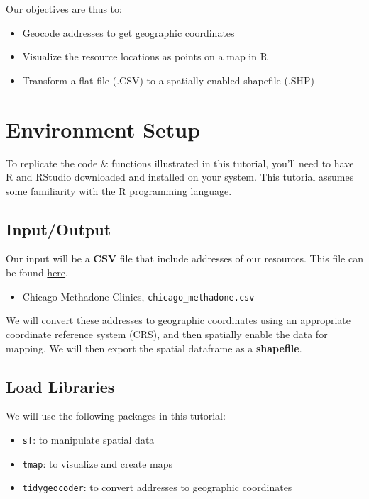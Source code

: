 \documentclass[
  letterpaper,
  DIV=11,
  numbers=noendperiod]{scrreprt}
\providecommand{\tightlist}{%
  \setlength{\itemsep}{0pt}\setlength{\parskip}{0pt}}
\begin{document}
Our objectives are thus to:

\begin{itemize}
\tightlist
\item
  Geocode addresses to get geographic coordinates
\item
  Visualize the resource locations as points on a map in R
\item
  Transform a flat file (.CSV) to a spatially enabled shapefile (.SHP)
\end{itemize}

\section{Environment Setup}\label{GA-setup}

To replicate the code \& functions illustrated in this tutorial, you'll
need to have R and RStudio downloaded and installed on your system. This
tutorial assumes some familiarity with the R programming language.

\subsection{Input/Output}\label{GA-i-o}

Our input will be a \textbf{CSV} file that include addresses of our
resources. This file can be found
\href{https://github.com/GeoDaCenter/opioid-environment-toolkit/tree/master/data}{here}.

\begin{itemize}
\tightlist
\item
  Chicago Methadone Clinics, \texttt{chicago\_methadone.csv}
\end{itemize}

We will convert these addresses to geographic coordinates using an
appropriate coordinate reference system (CRS), and then spatially enable
the data for mapping. We will then export the spatial dataframe as a
\textbf{shapefile}.

\subsection{Load Libraries}\label{GA-packages1}

We will use the following packages in this tutorial:

\begin{itemize}
\tightlist
\item
  \texttt{sf}: to manipulate spatial data
\item
  \texttt{tmap}: to visualize and create maps
\item
  \texttt{tidygeocoder}: to convert addresses to geographic coordinates
\end{itemize}
\end{document}
